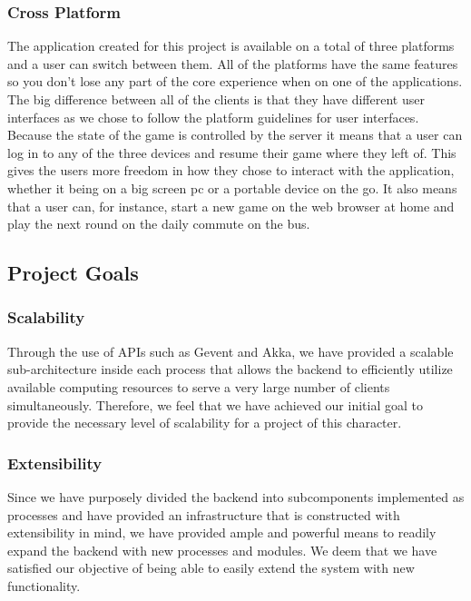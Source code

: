 \subsubsection{Cross Platform}
The application created for this project is available on a total of three platforms and a user can switch between them. All of the platforms have the same features so you don't lose any part of the core experience when on one of the applications. The big difference between all of the clients is that they have different user interfaces as we chose to follow the platform guidelines for user interfaces.\\
Because the state of the game is controlled by the server it means that a user can log in to any of the three devices and resume their game where they left of. This gives the users more freedom in how they chose to interact with the application, whether it being on a big screen pc or a portable device on the go. It also means that a user can, for instance, start a new game on the web browser at home and play the next round on the daily commute on the bus.

\subsection{Project Goals}
\subsubsection{Scalability}
Through the use of APIs such as Gevent and Akka, we have provided a scalable sub-architecture inside each process that allows the backend to efficiently utilize available computing resources to serve a very large number of clients simultaneously. Therefore, we feel that we have achieved our initial goal to provide the necessary level of scalability for a project of this character.
\subsubsection{Extensibility}
Since we have purposely divided the backend into subcomponents implemented as processes and have provided an infrastructure that is constructed with extensibility in mind, we have provided ample and powerful means to readily expand the backend with new processes and modules. We deem that we have satisfied our objective of being able to easily extend the system with new functionality.